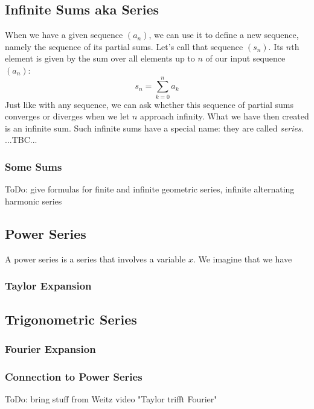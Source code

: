

\subsection{Infinite Sums aka Series}
When we have a given sequence $(a_n)$, we can use it to define a new sequence, namely the sequence of its partial sums. Let's call that sequence $(s_n)$. Its $n$th element is given by the sum over all elements up to $n$ of our input sequence $(a_n)$:
\begin{equation}
 s_n = \sum_{k=0}^n a_k
\end{equation}
Just like with any sequence, we can ask whether this sequence of partial sums converges or diverges when we let $n$ approach infinity. What we have then created is an infinite sum. Such infinite sums have a special name: they are called \emph{series}.
...TBC...


\subsubsection{Some Sums}
ToDo: give formulas for finite and infinite geometric series, infinite alternating harmonic series


\subsection{Power Series}
A power series is a series that involves a variable $x$. We imagine that we have 

\subsubsection{Taylor Expansion}



\subsection{Trigonometric Series}

\subsubsection{Fourier Expansion}

\subsubsection{Connection to Power Series}
ToDo: bring stuff from Weitz video "Taylor trifft Fourier"